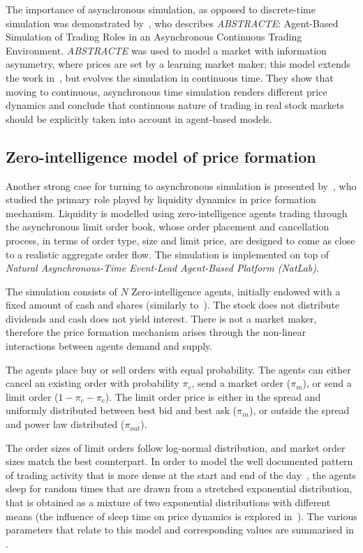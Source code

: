 The importance of asynchronous simulation, as opposed to discrete-time simulation was demonstrated by~\citet{Sorban2008}, who describes \textit{ABSTRACTE}: Agent-Based Simulation of Trading Roles in an Asynchronous Continuous Trading Environment. \textit{ABSTRACTE} was used to model a market with information asymmetry, where prices are set by a learning market maker; this model extends the work in~\citep{Das2006}, but evolves the simulation in continuous time. They show that moving to continuous, asynchronous time simulation renders different price dynamics and conclude that continuous nature of trading in real stock markets should be explicitly taken into account in agent-based models.

\subsection{Zero-intelligence model of price formation}

Another strong case for turning to asynchronous simulation is presented by~\citet[chap.~4]{Gilles2006}, who studied the primary role played by liquidity dynamics in price formation mechanism. Liquidity is modelled using zero-intelligence agents trading through the asynchronous limit order book, whose order placement and cancellation process, in terms of order type, size and limit price, are designed to come as close to a realistic aggregate order flow. The simulation is implemented on top of \textit{Natural Asynchronous-Time Event-Lead Agent-Based Platform (NatLab)}.  

The simulation consists of $N$ Zero-intelligence agents, initially endowed with a fixed amount of cash and shares (similarly to~\cite{Raberto2001}). The stock does not distribute dividends and cash does not yield interest. There is not a market maker, therefore the price formation mechanism arises through the non-linear interactions between agents demand and supply.

The agents place buy or sell orders with equal probability. The agents can either cancel an existing order with probability $\pi_c$, send a market order ($\pi_m$), or send a limit order ($1-\pi_c-\pi_c$). The limit order price is either in the spread and uniformly distributed between best bid and best ask ($\pi_{in}$), or outside the spread and power law distributed ($\pi_{out}$).

The order sizes of limit orders follow log-normal distribution, and market order sizes match the best counterpart. In order to model the well documented pattern of trading activity that is more dense at the start and end of the day~\cite{Clark1973}, the agents sleep for random times that are drawn from a stretched exponential distribution, that is obtained as a mixture of two exponential distributions with different means (the influence of sleep time on price dynamics is explored in~\cite{Scalas2004}). The various parameters that relate to this model and corresponding values are summarised in .

